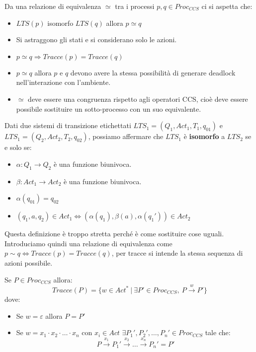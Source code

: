 Da una relazione di equivalenza $\simeq$ tra i processi $p, q \in Proc_{CCS}$ ci
si aspetta che:
\begin{itemize}
    \item $LTS(p)$ isomorfo $LTS(q)$ allora $p \simeq q$
    \item Si astraggono gli stati e si considerano solo le azioni.
    \item $p \simeq q \Rightarrow Tracce(p) = Tracce(q)$
    \item $p \simeq q$ allora $p$ e $q$ devono avere la stessa possibilità di
          generare deadlock nell'interazione con l'ambiente.
    \item $\simeq$ deve essere una congruenza rispetto agli operatori CCS, cioè
          deve essere possibile sostituire un sotto-processo con un suo equivalente.
\end{itemize}
\begin{definizione}
    Dati due sistemi di transizione etichettati $LTS_1 = (Q_1, Act_1, T_1, q_{01})$
    e $LTS_1 = (Q_2, Act_2, T_2, q_{02})$, possiamo affermare che
    $LTS_1$ è \textbf{isomorfo} a $LTS_2$ se e solo se:
    \begin{itemize}
        \item $\alpha: Q_1 \to Q_2$ è una funzione biunivoca.
        \item $\beta: Act_1 \to Act_2$ è una funzione biunivoca.
        \item $\alpha(q_{01}) = q_{02}$
        \item $(q_1, a, q_2) \in Act_1 \iff (\alpha(q_1), \beta(a), \alpha(q_1'))
                  \in Act_2$
    \end{itemize}
\end{definizione}
Questa definizione è troppo stretta perché è come sostituire cose uguali.
Introduciamo quindi una relazione di equivalenza come $p \sim q \iff Tracce(p) =
    Tracce(q)$, per tracce si intende la stessa sequenza di azioni possibile.
\begin{definizione}
    Se $P \in Proc_{CCS}$ allora:
    \begin{equation}
        Tracce(P) = \{w \in Act^* \ | \ \exists P' \in Proc_{CCS}, \
        P \xrightarrow{w} P'\}
    \end{equation}
    dove:
    \begin{itemize}
        \item Se $w = \varepsilon$ allora $P =  P'$
        \item Se $w = x_1 \cdot x_2 \cdot \dots \cdot x_n$ con $x_i \in Act$
              $\exists P_1', P_2', \dots, P_n' \in Proc_{CCS}$ tale che:
              \begin{equation}
                  P \xrightarrow{x_1} P_1' \xrightarrow{x_2} \dots
                  \xrightarrow{x_n} P_n' = P'
              \end{equation}
    \end{itemize}
\end{definizione}
